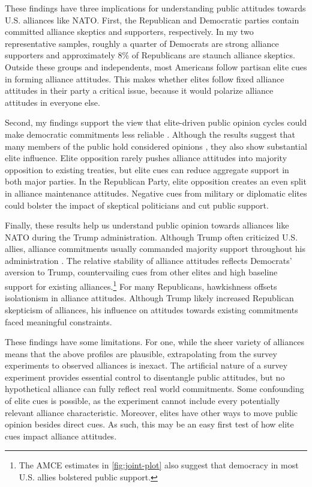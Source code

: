 \documentclass[12pt]{article}
\begin{document}
These findings have three implications for understanding public attitudes towards U.S. alliances like NATO. 
First, the Republican and Democratic parties contain committed alliance skeptics and supporters, respectively.
In my two representative samples, roughly a quarter of Democrats are strong alliance supporters and approximately 8\% of Republicans are staunch alliance skeptics.
Outside these groups and independents, most Americans follow partisan elite cues in forming alliance attitudes. 
This makes whether elites follow fixed alliance attitudes in their party a critical issue, because it would polarize alliance attitudes in everyone else.  


Second, my findings support the view that elite-driven public opinion cycles could make democratic commitments less reliable \citep{GartzkeGleditsch2004}. 
Although the results suggest that many members of the public hold considered opinions \citep{PageShapiro1992}, they also show substantial elite influence. 
Elite opposition rarely pushes alliance attitudes into majority opposition to existing treaties, but elite cues can reduce aggregate support in both major parties.
In the Republican Party, elite opposition creates an even split in alliance maintenance attitudes. 
Negative cues from military or diplomatic elites could bolster the impact of skeptical politicians and cut public support. 


Finally, these results help us understand public opinion towards alliances like NATO during the Trump administration.
Although Trump often criticized U.S. allies, alliance commitments usually commanded majority support throughout his administration \citep{PewNATO2020}. 
The relative stability of alliance attitudes reflects Democrats' aversion to Trump, countervailing cues from other elites and high baseline support for existing alliances.\footnote{The AMCE estimates in \autoref{fig:joint-plot} also suggest that democracy in most U.S. allies bolstered public support.}
For many Republicans, hawkishness offsets isolationism in alliance attitudes.
Although Trump likely increased Republican skepticism of alliances, his influence on attitudes towards existing commitments faced meaningful constraints. 


These findings have some limitations. 
For one, while the sheer variety of alliances means that the above profiles are plausible, extrapolating from the survey experiments to observed alliances is inexact. 
The artificial nature of a survey experiment provides essential control to disentangle public attitudes, but no hypothetical alliance can fully reflect real world commitments.
Some confounding of elite cues is possible, as the experiment cannot include every potentially relevant alliance characteristic. 
Moreover, elites have other ways to move public opinion besides direct cues.
As such, this may be an easy first test of how elite cues impact alliance attitudes. 
\end{document}
